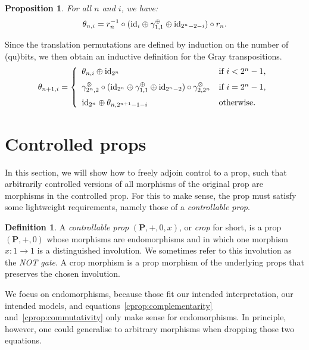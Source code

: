 \documentclass[a4paper]{article}
\theoremstyle{plain}
\newtheorem{proposition}[theorem]{Proposition}
\theoremstyle{definition}
\newtheorem{definition}[theorem]{Definition}
\newcommand{\cat}[1]{\mathbf{#1}}
\newcommand{\symtimes}{\gamma^\otimes}
\newcommand{\symplus}{\gamma^\oplus}
\newcommand{\iid}{\mathrm{id}}
\begin{document}
\begin{proposition}
	\label{prop:gray-transposition}
	For all $n$ and $i$, we have:
	\[
		\theta_{n,i} =
		r_n^{-1} \circ (\iid_i \oplus \symplus_{1,1} \oplus \iid_{2^n - 2 - i}) \circ r_n \text.
	\]
\end{proposition}

Since the translation permutations are defined by induction on the number of
(qu)bits, we then obtain an inductive definition for the Gray transpositions.
\begin{equation}\label{eq:ind-theta}
	\theta_{n+1,i} =
	\left\{
		\begin{array}{ll}
			\theta_{n,i} \oplus \iid_{2^n} & \text{if } i < 2^n - 1\text, \\[1.5ex]
			\symtimes_{2^n,2} \circ (\iid_{2^n} \oplus \symplus_{1,1} \oplus
			\iid_{2^n-2}) \circ \symtimes_{2,2^n}
			& \text{if } i = 2^n - 1\text, \\[1.5ex]
			\iid_{2^n} \oplus \theta_{n,2^{n+1} - 1 - i} & \text{otherwise.}
		\end{array}
	\right.
\end{equation}

\section{Controlled props}
\label{sec:control}
In this section, we will show how to freely adjoin control to a prop,
such that arbitrarily controlled versions of all morphisms of the
original prop are morphisms in the controlled prop. For this
to make sense, the prop must satisfy some lightweight requirements,
namely those of a \emph{controllable prop}.

\begin{definition}
	\label{def:controllable}
	A \emph{controllable prop} $(\cat P, +, 0, x)$, or \emph{crop} for short, is
	a prop $(\cat P, +, 0)$ whose morphisms are endomorphisms and in which one
	morphism $x \colon 1 \to 1$ is a distinguished involution. We sometimes
	refer to this involution as the \emph{NOT gate}. A crop morphism is a prop
	morphism of the underlying props that preserves the chosen involution.
\end{definition}

We focus on endomorphisms, because those fit our intended interpretation, our intended models, and equations~\ref{cprop:complementarity} and~\ref{cprop:commutativity} only make sense for endomorphisms. In principle, however, one could generalise to arbitrary morphisms when dropping those two equations.
\end{document}
